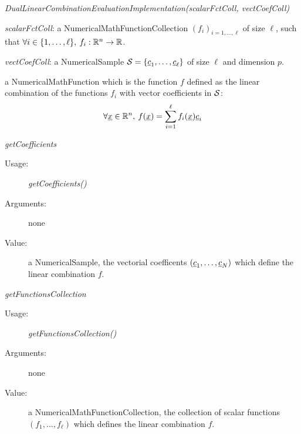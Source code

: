 \begin{description}

\item[Usage:]   \rule{0pt}{1em}
\begin{description}
\item \textit{DualLinearCombinationEvaluationImplementation(scalarFctColl, vectCoefColl)}
\end{description}

\item[Arguments:]  \rule{0pt}{1em}
\begin{description}
\item \textit{scalarFctColl}: a NumericalMathFunctionCollection $(f_i)_{i=1,\hdots,\ell}$ of size $\ell$, such that $\forall i\in\{1,\hdots,\ell\},\: f_i:{\mathbb R}^n\rightarrow{\mathbb R}$.
\item \textit{vectCoefColl}: a NumericalSample ${\mathcal S}=\{{\underline{c}}_1, \hdots, {\underline{c}}_{\ell}\}$ of size $\ell$ and dimension $p$.
\end{description}


\item[Value:] a NumericalMathFunction which is the function $f$ defined as the linear combination of the functions $f_i$ with vector coefficients in ${\mathcal S}$:
\begin{equation*}
\forall{\underline{x}}\in{\mathbb R}^n,\:f({\underline{x}})=\sum_{i=1}^{\ell}f_i({\underline{x}}){\underline{c}}_i
\end{equation*}

\item[Some methods:]  \rule{0pt}{1em}
\begin{description}

\item \textit{getCoefficients}
\begin{description}
\item[Usage:] \textit{getCoefficients()}
\item[Arguments:] none
\item[Value:] a NumericalSample, the vectorial coefficents $({\underline{c}}_1, \hdots, {\underline{c}}_N)$ which define the linear combination $f$.
\end{description}
\bigskip

\item \textit{getFunctionsCollection}
\begin{description}
\item[Usage:] \textit{getFunctionsCollection()}
\item[Arguments:] none
\item[Value:] a NumericalMathFunctionCollection, the collection of scalar functions $(f_1, \hdots, f_{\ell})$  which defines the linear combination $f$.
\end{description}
\bigskip


\end{description}
\end{description}
